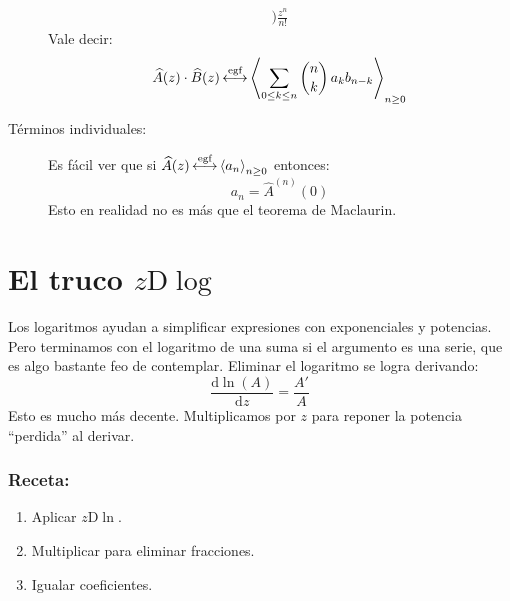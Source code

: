\begin{description}
\begin{align*}
			  \biggr)
	       \frac{z^n}{n!}
    \end{align*}
    Vale decir:
    \begin{equation*}
      \widehat{A}(z) \cdot \widehat{B}(z)
	\operatorname{\stackrel{\text{egf}}{\longleftrightarrow}} \left\langle
	       \sum_{0 \le k \le n} \binom{n}{k} \, a_k b_{n - k}
	     \right\rangle_{n \ge 0}
    \end{equation*}
  \item[Términos individuales:]
    Es fácil ver que si
    \(\widehat{A}(z)
	\operatorname{\stackrel{\text{egf}}{\longleftrightarrow}} \left\langle a_n \right\rangle_{n \ge 0}\) entonces:
    \begin{equation*}
      a_n = \widehat{A}^{(n)}(0)
    \end{equation*}
    Esto en realidad no es más que el teorema de Maclaurin.%
  \end{description}

\section[\texorpdfstring{El truco $z \mathrm{D} \log$}
			{Derivada logarítmica}]
	{\protect\boldmath
	   \texorpdfstring{El truco $z \mathrm{D}\log$}
			  {Derivada logarítmica}%
       \protect\unboldmath}

  Los logaritmos ayudan a simplificar expresiones con exponenciales
  y potencias.
  Pero terminamos con el logaritmo de una suma
  si el argumento es una serie,
  que es algo bastante feo de contemplar.
  Eliminar el logaritmo se logra derivando:
  \begin{equation*}
    \frac{\mathrm{d} \ln(A)}{\mathrm{d} z} = \frac{A'}{A}
  \end{equation*}
  Esto es mucho más decente.
  Multiplicamos por \(z\)
  para reponer la potencia ``perdida'' al derivar.

\subsubsection*{Receta:}

  \begin{enumerate}
  \item
    Aplicar \(z \mathrm{D} \ln\).
  \item
    Multiplicar para eliminar fracciones.
  \item
    Igualar coeficientes.
  \end{enumerate}

